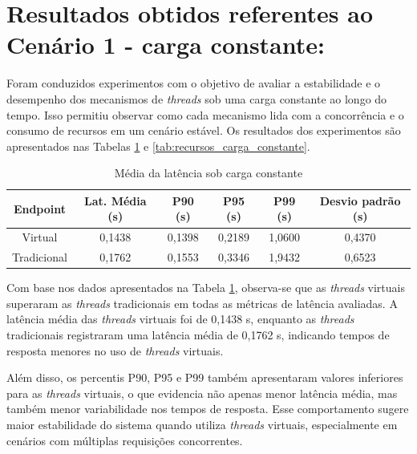 \documentclass[12pt, openright, oneside, a4paper, english,	french,	spanish, brazil	]{abntex2}
\begin{document}
\section{Resultados obtidos referentes ao Cenário 1 - carga constante: }

Foram conduzidos experimentos com o objetivo de avaliar a estabilidade e o desempenho dos mecanismos de \textit{threads} sob uma carga constante ao longo do tempo. Isso permitiu observar como cada mecanismo lida com a concorrência e o consumo de recursos em um cenário estável. Os resultados dos experimentos são apresentados nas Tabelas \ref{tab:latencia_carga_constante} e \ref{tab:recursos_carga_constante}.

\begin{table}[H]
    \centering
    \caption{\footnotesize Média da latência sob carga constante}
    \label{tab:latencia_carga_constante}
    \footnotesize
    \renewcommand{\arraystretch}{1.15}
    \setlength{\tabcolsep}{5pt}
    \begin{tabular}{cccccc}
        \toprule
        \textbf{Endpoint} &
        \textbf{Lat. Média (s)} &
        \textbf{P90 (s)} &
        \textbf{P95 (s)} &
        \textbf{P99 (s)} &
        \textbf{Desvio padrão (s)} \\
        \midrule
        Virtual           & 0,1438 & 0,1398 & 0,2189 & 1,0600 & 0,4370\\
        Tradicional          & 0,1762 & 0,1553 & 0,3346 & 1,9432 & 0,6523\\
        \bottomrule
    \end{tabular}
\end{table}


Com base nos dados apresentados na Tabela \ref{tab:latencia_carga_constante}, observa-se que as \textit{threads} virtuais superaram as \textit{threads} tradicionais em todas as métricas de latência avaliadas. A latência média das \textit{threads} virtuais foi de 0,1438 s, enquanto as \textit{threads} tradicionais registraram uma latência média de 0,1762 s, indicando tempos de resposta menores no uso de \textit{threads} virtuais. 

Além disso, os percentis P90, P95 e P99 também apresentaram valores inferiores para as \textit{threads} virtuais, o que evidencia não apenas menor latência média, mas também menor variabilidade nos tempos de resposta. Esse comportamento sugere maior estabilidade do sistema quando utiliza \textit{threads} virtuais, especialmente em cenários com múltiplas requisições concorrentes.
\end{document}
